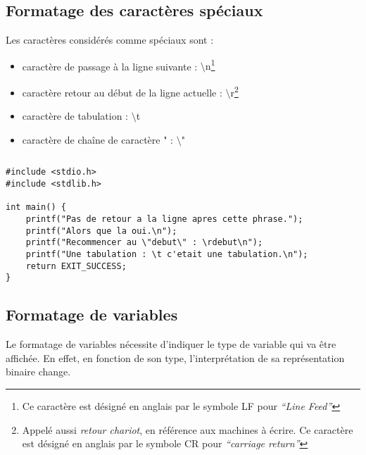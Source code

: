 \documentclass[../../../main.tex]{subfiles}
\begin{document}
\subsection{Formatage des caractères spéciaux}
Les caractères considérés comme spéciaux sont :
\begin{itemize}
	\item caractère de passage à la ligne suivante : \textsf{$\setminus$n}\footnote{Ce caractère est désigné en anglais par le symbole \textsf{LF} pour \textit{``Line Feed''}}
	\item caractère retour au début de la ligne actuelle : \textsf{$\setminus$r}\footnote{Appelé aussi \textit{retour chariot}, en référence aux machines à écrire. Ce caractère est désigné en anglais par le symbole \textsf{CR} pour \textit{``carriage return''}}
	\item caractère de tabulation : \textsf{$\setminus$t}
	\item caractère de chaîne de caractère \textsf{"} : \textsf{$\setminus$"}
\end{itemize}
\begin{lstlisting}[title=Exemples]
\end{lstlisting}
\begin{verbatim}
#include <stdio.h>
#include <stdlib.h>

int main() {
	printf("Pas de retour a la ligne apres cette phrase.");
	printf("Alors que la oui.\n");
	printf("Recommencer au \"debut\" : \rdebut\n");
	printf("Une tabulation : \t c'etait une tabulation.\n");
	return EXIT_SUCCESS;
}
\end{verbatim}
\subsection{Formatage de variables}
Le formatage de variables nécessite d'indiquer le type de variable qui va être affichée. En effet, en fonction de son type, l'interprétation de sa représentation binaire change.
 
\end{document}
